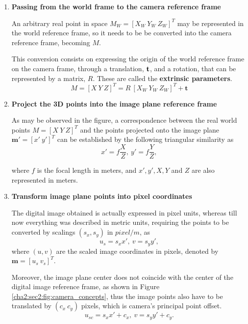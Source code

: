 \begin{enumerate}
	\item \textbf{Passing from the world frame to the camera reference frame}
	
	An arbitrary real point in space $M_W = [X_W \ Y_W \ Z_W]^T$ may be represented in the world reference frame, so it needs to be be converted into the camera reference frame, becoming $M$.
	
	This conversion consists on expressing the origin of the world reference frame on the camera frame, through a translation, $\bf t$, and a rotation, that can be represented by a matrix, $R$. These are called the \textbf{extrinsic parameters}.
	\begin{equation}
		M = [X \ Y \ Z]^T = R \ [X_W \ Y_W \ Z_W]^T + \mathbf{t}
	\end{equation}
	
	\item \textbf{Project the 3D points into the image plane reference frame}
	
	As may be observed in the figure, a correspondence between the real world points $M = [X \ Y \ Z]^T$ and the points projected onto the image plane $\mathbf{m'} = [x' \ y']^T$ can be established by the following triangular similarity as
	\begin{equation}
	\label{cha2:sec2:eq:trisimilar}
	x' = f\frac{X}{Z}, \ y' = f\frac{Y}{Z},
	\end{equation}
	
	where $f$ is the focal length in meters, and $x', y', X ,Y$ and $Z$ are also represented in meters.	
	
	\item \textbf{Transform image plane points into pixel coordinates}
	
	The digital image obtained is actually expressed in pixel units, whereas till now everything was described in metric units, requiring the points to be converted by scalings $(s_x, s_y)$ in $pixel/m$, as 
	\begin{equation}
	\label{cha2:sec2:eq:trisimilar}
	u_s = s_x x', \ v = s_y y',
	\end{equation}
	where $(u,v)$ are the scaled image coordinates in pixels, denoted by $\mathbf{m} = [u_s \ v_s]^T$.
	
	Moreover, the image plane center does not coincide with the center of the digital image reference frame, as shown in Figure \ref{cha2:sec2:fig:camera_concepts}, thus the image points also have to be translated by $(c_x \ c_y)$ pixels, which is camera's principal point offset. 
	\begin{equation}
	\label{cha2:sec2:eq:trisimilar}
	u_{sc} = s_x x' + c_x, \ v = s_y y' + c_y.
	\end{equation}
	

\end{enumerate}
